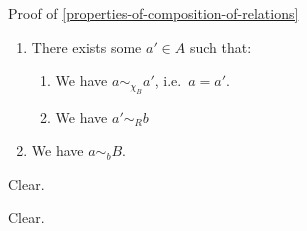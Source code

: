 \begin{Proof}{Proof of \cref{properties-of-composition-of-relations}}
\begin{itemize}
            \begin{enumerate}
                \item There exists some $a'\in A$ such that:
                    \begin{enumerate}
                        \item We have $a\sim_{\chi_{B}}a'$, i.e.\ $a=a'$.
                        \item We have $a'\sim_{R}b$
                    \end{enumerate}
                \item We have $a\sim_{b}B$.
            \end{enumerate}
    \end{itemize}

    Clear.

    Clear.
\end{Proof}
